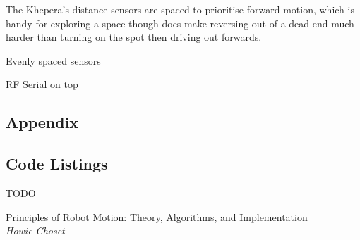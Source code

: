 \documentclass[11pt, a4paper]{article}
\begin{document}
The Khepera's distance sensors are spaced to prioritise forward motion, which is handy 
for exploring a space though does make reversing out of a dead-end much harder than 
turning on the spot then driving out forwards.

Evenly spaced sensors

RF Serial on top




\begin{appendices}
\section*{Appendix}
\subsection{Code Listings}
TODO
%
\end{appendices}


\begin{thebibliography}{1}

Principles of Robot Motion: Theory, Algorithms, and Implementation\\
\textit{Howie Choset}

\end{thebibliography}
\end{document}
